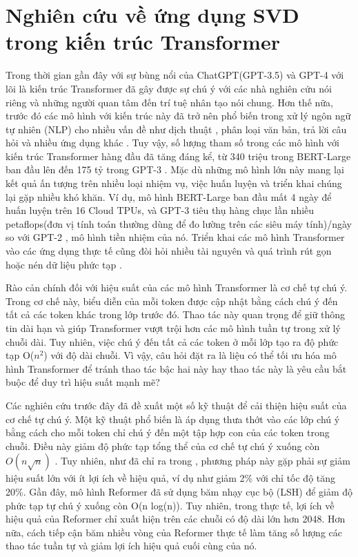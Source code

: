 \documentclass[12pt,a4paper,oneside]{report}
\numberwithin{equation}{section}
\begin{document}
\section{Nghiên cứu về ứng dụng SVD trong kiến trúc Transformer}
Trong thời gian gần đây với sự bùng nổi của ChatGPT(GPT-3.5) và GPT-4 với lõi là kiến trúc Transformer \cite{vaswani2017} đã gây được sự chú ý với các nhà nghiên cứu nói riêng và những người quan tâm đến trí tuệ nhân tạo nói chung. Hơn thế nữa, trước đó các mô hình với kiến trúc này đã trở nên phổ biến trong xử lý ngôn ngữ tự nhiên (NLP) cho nhiều vấn đề như dịch thuật \cite{ott2018}, phân loại văn bản, trả lời câu hỏi và nhiều ứng dụng khác \cite{raffel2019}. Tuy vậy, số lượng tham số trong các mô hình với kiến trúc Transformer hàng đầu đã tăng đáng kể, từ 340 triệu trong BERT-Large ban đầu lên đến 175 tỷ trong GPT-3 \cite{brown2020}. Mặc dù những mô hình lớn này mang lại kết quả ấn tượng trên nhiều loại nhiệm vụ, việc huấn luyện và triển khai chúng lại gặp nhiều khó khăn. Ví dụ, mô hình BERT-Large \cite{devlin2019} ban đầu mất 4 ngày để huấn luyện trên 16 Cloud TPUs, và GPT-3 tiêu thụ hàng chục lần nhiều petaflops(đơn vị tính toán thường dùng để đo lường trên các siêu máy tính)/ngày so với GPT-2 \cite{radford2019}, mô hình tiền nhiệm của nó. Triển khai các mô hình Transformer vào các ứng dụng thực tế cũng đòi hỏi nhiều tài nguyên và quá trình rút gọn hoặc nén dữ liệu phức tạp \cite{hinton2015}.

Rào cản chính đối với hiệu suất của các mô hình Transformer là cơ chế tự chú ý. Trong cơ chế này, biểu diễn của mỗi token được cập nhật bằng cách chú ý đến tất cả các token khác trong lớp trước đó. Thao tác này quan trọng để giữ thông tin dài hạn và giúp Transformer vượt trội hơn các mô hình tuần tự trong xử lý chuỗi dài. Tuy nhiên, việc chú ý đến tất cả các token ở mỗi lớp tạo ra độ phức tạp O($n^2$) với độ dài chuỗi. Vì vậy, câu hỏi đặt ra là liệu có thể tối ưu hóa mô hình Transformer để tránh thao tác bậc hai này hay thao tác này là yêu cầu bắt buộc để duy trì hiệu suất mạnh mẽ?

Các nghiên cứu trước đây đã đề xuất một số kỹ thuật để cải thiện hiệu suất của cơ chế tự chú ý. Một kỹ thuật phổ biến là áp dụng thưa thớt vào các lớp chú ý \cite{child2019, qiu2019, beltagy2020} bằng cách cho mỗi token chỉ chú ý đến một tập hợp con của các token trong chuỗi. Điều này giảm độ phức tạp tổng thể của cơ chế tự chú ý xuống còn $O(n\sqrt{n})$ \cite{child2019}. Tuy nhiên, như đã chỉ ra trong \cite{qiu2019}, phương pháp này gặp phải sự giảm hiệu suất lớn với ít lợi ích về hiệu quả, ví dụ như giảm 2\% với chỉ tốc độ tăng 20\%. Gần đây, mô hình Reformer \cite{kitaev2020} đã sử dụng băm nhạy cục bộ (LSH) để giảm độ phức tạp tự chú ý xuống còn O(n log(n)). Tuy nhiên, trong thực tế, lợi ích về hiệu quả của Reformer chỉ xuất hiện trên các chuỗi có độ dài lớn hơn 2048. Hơn nữa, cách tiếp cận băm nhiều vòng của Reformer thực tế làm tăng số lượng các thao tác tuần tự và giảm lợi ích hiệu quả cuối cùng của nó. 
\end{document}

